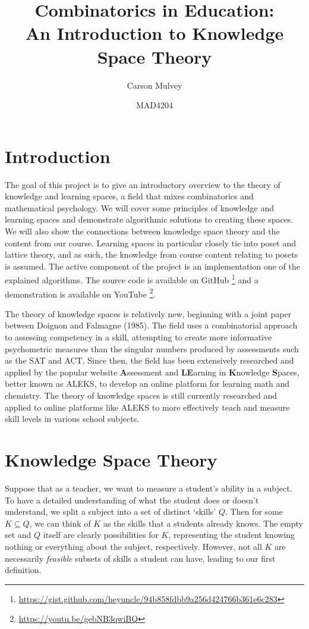\documentclass[11pt,letterpaper,dvipsnames]{article}
\title{\textbf{Combinatorics in Education:\\ An Introduction to Knowledge Space Theory}}
\author{Carson Mulvey}
\date{MAD4204}
\theoremstyle{definition}
\begin{document}
\maketitle

\section*{Introduction} %

The goal of this project is to give an introductory overview to the theory of knowledge and learning spaces, a field that mixes combinatorics and mathematical psychology. We will cover some principles of knowledge and learning spaces and demonstrate algorithmic solutions to creating these spaces. We will also show the connections between knowledge space theory and the content from our course. Learning spaces in particular closely tie into poset and lattice theory, and as such, the knowledge from course content relating to posets is assumed. The active component of the project is an implementation one of the explained algorithms. The source code is available on GitHub
\footnote{\href{https://gist.github.com/heyuncle/94b858fdbb9a256d424766b361e6c283}{https://gist.github.com/heyuncle/94b858fdbb9a256d424766b361e6c283}} 
and a demonstration is available on YouTube
\footnote{\href{https://youtu.be/gebNB3qwiBQ}{https://youtu.be/gebNB3qwiBQ}}.

The theory of knowledge spaces is relatively new, beginning with a joint paper between Doignon and Falmagne (1985). The field uses a combinatorial approach to assessing competency in a skill, attempting to create more informative psychometric measures than the singular numbers produced by assessments such as the SAT and ACT. Since then, the field has been extensively researched and applied by the popular website \textbf{A}ssessment and \textbf{LE}arning in \textbf{K}nowledge \textbf{S}paces, better known as ALEKS, to develop an online platform for learning math and chemistry. The theory of knowledge spaces is still currently researched and applied to online platforms like ALEKS to more effectively teach and measure skill levels in various school subjects.


\section{Knowledge Space Theory}

Suppose that as a teacher, we want to measure a student's ability in a subject. To have a detailed understanding of what the student does or doesn't understand, we split a subject into a set of distinct `skills' $Q$. Then for some $K\subseteq Q$, we can think of $K$ as the skills that a students already knows. The empty set and $Q$ itself are clearly possibilities for $K$, representing the student knowing nothing or everything about the subject, respectively. However, not all $K$ are necessarily \textit{feasible} subsets of skills a student can have, leading to our first definition.
\end{document}
